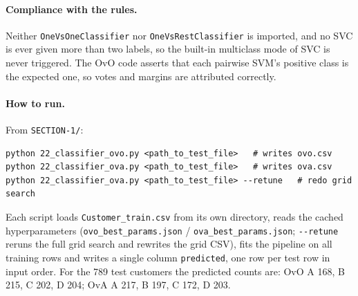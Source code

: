 \documentclass[11pt]{article}
\begin{document}
\paragraph{Compliance with the rules.} Neither \texttt{OneVsOneClassifier} nor
\texttt{OneVsRestClassifier} is imported, and no SVC is ever given more than two labels, so the
built-in multiclass mode of SVC is never triggered. The OvO code asserts that each pairwise SVM's
positive class is the expected one, so votes and margins are attributed correctly.

\paragraph{How to run.} From \texttt{SECTION-1/}:
\begin{lstlisting}
python 22_classifier_ovo.py <path_to_test_file>   # writes ovo.csv
python 22_classifier_ova.py <path_to_test_file>   # writes ova.csv
python 22_classifier_ova.py <path_to_test_file> --retune   # redo grid search
\end{lstlisting}
Each script loads \texttt{Customer\_train.csv} from its own directory, reads the cached
hyperparameters (\texttt{ovo\_best\_params.json} / \texttt{ova\_best\_params.json}; \texttt{-{}-retune}
reruns the full grid search and rewrites the grid CSV), fits the pipeline on all training rows and
writes a single column \texttt{predicted}, one row per test row in input order. For the 789 test
customers the predicted counts are: OvO A 168, B 215, C 202, D 204; OvA A 217, B 197, C 172, D 203.
\end{document}
